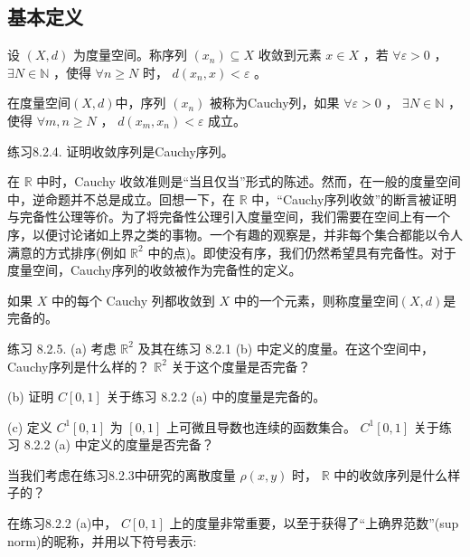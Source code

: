 \subsection{基本定义}
\begin{Def}
  \label{def:8.2.2}
  设 $(X, d)$ 为度量空间。称序列 \(\left( {x}_{n}\right)  \subseteq  X\) 收敛到元素 \(x \in  X\) ，若 \(\forall \varepsilon  > 0\) ， \(\exists N \in  \mathbb{N}\) ，使得 \(\forall n \geq  N\) 时， \(d\left( {{x}_{n},x}\right)  < \varepsilon\) 。
\end{Def}

\begin{Def}
  \label{def:8.2.3}
  在度量空间$(X, d)$中，序列 \(\left( {x}_{n}\right)\) 被称为Cauchy列，如果 \(\forall \varepsilon  > 0\) ， \(\exists N \in  \mathbb{N}\) ，使得 \(\forall m,n \geq  N\) ， \(d\left( {{x}_{m},{x}_{n}}\right)  < \varepsilon\) 成立。
\end{Def}

练习8.2.4. 证明收敛序列是Cauchy序列。

在 \(\mathbb{R}\) 中时，Cauchy 收敛准则是“当且仅当”形式的陈述。然而，在一般的度量空间中，逆命题并不总是成立。回想一下，在 \(\mathbb{R}\) 中，“Cauchy序列收敛”的断言被证明与完备性公理等价。为了将完备性公理引入度量空间，我们需要在空间上有一个序，以便讨论诸如上界之类的事物。一个有趣的观察是，并非每个集合都能以令人满意的方式排序(例如 \({\mathbb{R}}^{2}\) 中的点)。即使没有序，我们仍然希望具有完备性。对于度量空间，Cauchy序列的收敛被作为完备性的定义。

\begin{Def}
  如果 \(X\) 中的每个 Cauchy 列都收敛到 \(X\) 中的一个元素，则称度量空间$(X, d)$是完备的。
\end{Def}


练习 8.2.5. (a) 考虑 \({\mathbb{R}}^{2}\) 及其在练习 8.2.1 (b) 中定义的度量。在这个空间中，Cauchy序列是什么样的？ \({\mathbb{R}}^{2}\) 关于这个度量是否完备？

(b) 证明 \(C\left\lbrack  {0,1}\right\rbrack\) 关于练习 8.2.2 (a) 中的度量是完备的。

(c) 定义 \({C}^{1}\left\lbrack  {0,1}\right\rbrack\) 为 \(\left\lbrack  {0,1}\right\rbrack\) 上可微且导数也连续的函数集合。 \({C}^{1}\left\lbrack  {0,1}\right\rbrack\) 关于练习 8.2.2 (a) 中定义的度量是否完备？

当我们考虑在练习8.2.3中研究的离散度量 \(\rho \left( {x,y}\right)\) 时， \(\mathbb{R}\) 中的收敛序列是什么样子的？

在练习8.2.2 (a)中， \(C\left\lbrack  {0,1}\right\rbrack\) 上的度量非常重要，以至于获得了“上确界范数”(sup norm)的昵称，并用以下符号表示:

